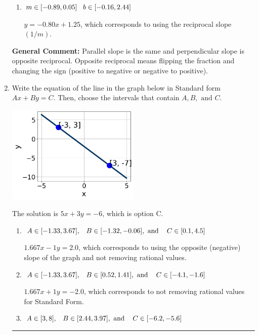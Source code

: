\documentclass{extbook}[14pt]
\newcommand{\litem}[1]{\item #1

\rule{\textwidth}{0.4pt}}
\begin{document}
\begin{enumerate}
{\begin{enumerate}[label=\Alph*.]
 $y = 1.25x + 8.75$, which corresponds to using the negative slope.
\item \( m \in [-0.89, 0.05] \hspace*{3mm} b \in [-0.16, 2.44] \)

 $y = -0.80x + 1.25$, which corresponds to using the reciprocal slope $(1/m)$.
\end{enumerate}

\textbf{General Comment:} Parallel slope is the same and perpendicular slope is opposite reciprocal. Opposite reciprocal means flipping the fraction and changing the sign (positive to negative or negative to positive).
}
\litem{
Write the equation of the line in the graph below in Standard form $Ax+By=C$. Then, choose the intervals that contain $A, B, \text{ and } C$.

\begin{center}
    \includegraphics[width=0.5\textwidth]{../Figures/linearGraphToStandardCopyC.png}
\end{center}


The solution is \( 5x + 3y = -6 \), which is option C.\begin{enumerate}[label=\Alph*.]
\item \( A \in [-1.33, 3.67], \hspace{3mm} B \in [-1.32, -0.06], \text{ and } \hspace{3mm} C \in [0.1, 4.5] \)

 $1.667x - 1y = 2.0$, which corresponds to using the opposite (negative) slope of the graph and not removing rational values.
\item \( A \in [-1.33, 3.67], \hspace{3mm} B \in [0.52, 1.41], \text{ and } \hspace{3mm} C \in [-4.1, -1.6] \)

 $1.667x + 1y = -2.0$, which corresponds to not removing rational values for Standard Form.
\item \( A \in [3, 8], \hspace{3mm} B \in [2.44, 3.97], \text{ and } \hspace{3mm} C \in [-6.2, -5.6] \)


\end{enumerate}}
\end{enumerate}
\end{document}
